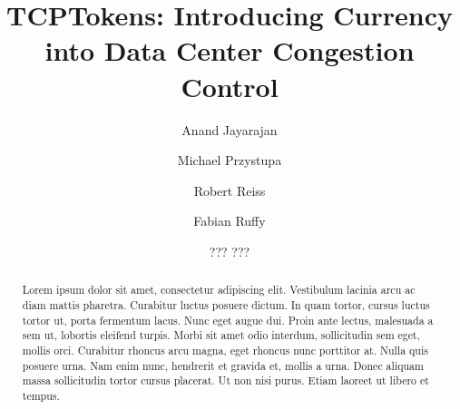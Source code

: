 \documentclass[sigconf]{acmart}
\begin{document}
\title{TCPTokens: Introducing Currency into Data Center Congestion Control}

\author{Anand Jayarajan}

\author{Michael Przystupa}

\author{Robert Reiss}

\author{Fabian Ruffy}

\author{??? ???}


\begin{abstract}
Lorem ipsum dolor sit amet, consectetur adipiscing elit. Vestibulum lacinia arcu ac diam mattis pharetra. Curabitur luctus posuere dictum. In quam tortor, cursus luctus tortor ut, porta fermentum lacus. Nunc eget augue dui. Proin ante lectus, malesuada a sem ut, lobortis eleifend turpis. Morbi sit amet odio interdum, sollicitudin sem eget, mollis orci. Curabitur rhoncus arcu magna, eget rhoncus nunc porttitor at. Nulla quis posuere urna. Nam enim nunc, hendrerit et gravida et, mollis a urna. Donec aliquam massa sollicitudin tortor cursus placerat. Ut non nisi purus. Etiam laoreet ut libero et tempus. 
\end{abstract}



\maketitle


% 








 
\end{document}
